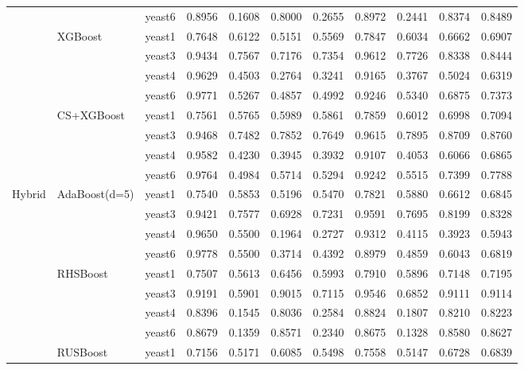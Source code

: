 \documentclass[sigconf]{acmart}
\begin{document}
\begin{table}[htbp]
\begin{tabular}{llccccccccc}
    & & yeast6 & 0.8956 & 0.1608 & 0.8000 & 0.2655 & 0.8972 & 0.2441 & 0.8374 & 0.8489 \\
    \cmidrule{2-11}
    & \multirow{4}{*}{XGBoost}
      & yeast1 & 0.7648 & 0.6122 & 0.5151 & 0.5569 & 0.7847 & 0.6034 & 0.6662 & 0.6907 \\
    & & yeast3 & 0.9434 & 0.7567 & 0.7176 & 0.7354 & 0.9612 & 0.7726 & 0.8338 & 0.8444 \\
    & & yeast4 & 0.9629 & 0.4503 & 0.2764 & 0.3241 & 0.9165 & 0.3767 & 0.5024 & 0.6319 \\
    & & yeast6 & 0.9771 & 0.5267 & 0.4857 & 0.4992 & 0.9246 & 0.5340 & 0.6875 & 0.7373 \\
    \cmidrule{2-11}
    & \multirow{4}{*}{CS+XGBoost}
      & yeast1 & 0.7561 & 0.5765 & 0.5989 & 0.5861 & 0.7859 & 0.6012 & 0.6998 & 0.7094 \\
    & & yeast3 & 0.9468 & 0.7482 & 0.7852 & 0.7649 & 0.9615 & 0.7895 & 0.8709 & 0.8760 \\
    & & yeast4 & 0.9582 & 0.4230 & 0.3945 & 0.3932 & 0.9107 & 0.4053 & 0.6066 & 0.6865 \\
    & & yeast6 & 0.9764 & 0.4984 & 0.5714 & 0.5294 & 0.9242 & 0.5515 & 0.7399 & 0.7788 \\
    \midrule
    \multirow{28}{*}{Hybrid}
    & \multirow{4}{*}{AdaBoost(d=5)}
      & yeast1 & 0.7540 & 0.5853 & 0.5196 & 0.5470 & 0.7821 & 0.5880 & 0.6612 & 0.6845 \\
    & & yeast3 & 0.9421 & 0.7577 & 0.6928 & 0.7231 & 0.9591 & 0.7695 & 0.8199 & 0.8328 \\
    & & yeast4 & 0.9650 & 0.5500 & 0.1964 & 0.2727 & 0.9312 & 0.4115 & 0.3923 & 0.5943 \\
    & & yeast6 & 0.9778 & 0.5500 & 0.3714 & 0.4392 & 0.8979 & 0.4859 & 0.6043 & 0.6819 \\
    \cmidrule{2-11}
    & \multirow{4}{*}{RHSBoost}
      & yeast1 & 0.7507 & 0.5613 & 0.6456 & 0.5993 & 0.7910 & 0.5896 & 0.7148 & 0.7195 \\
    & & yeast3 & 0.9191 & 0.5901 & 0.9015 & 0.7115 & 0.9546 & 0.6852 & 0.9111 & 0.9114 \\
    & & yeast4 & 0.8396 & 0.1545 & 0.8036 & 0.2584 & 0.8824 & 0.1807 & 0.8210 & 0.8223 \\
    & & yeast6 & 0.8679 & 0.1359 & 0.8571 & 0.2340 & 0.8675 & 0.1328 & 0.8580 & 0.8627 \\
    \cmidrule{2-11}
    & \multirow{4}{*}{RUSBoost}
      & yeast1 & 0.7156 & 0.5171 & 0.6085 & 0.5498 & 0.7558 & 0.5147 & 0.6728 & 0.6839 \\

\end{tabular}
\end{table}
\end{document}
